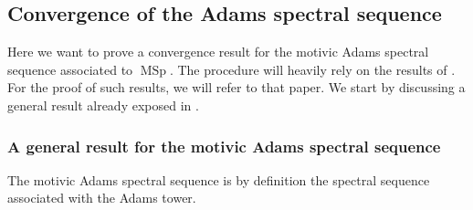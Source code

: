 \documentclass[10pt]{amsart}
\theoremstyle{definition}
\theoremstyle{plain}
\numberwithin{equation}{section}
\newcommand{\0}{\emptyset}
\newcommand{\MSp}{{\operatorname{MSp}}}
\begin{document}
\subsection{Convergence of the Adams spectral sequence}

Here we want to prove a convergence result for the motivic Adams spectral sequence associated to $\MSp$. The procedure will heavily rely on the results of \cite[Section 6]{lev:ellcoh}. For the proof of such results, we will refer to that paper. We start by discussing a general result already exposed in \cite{DugIsa:Adams}.

\subsubsection{A general result for the motivic Adams spectral sequence}
\label{sub:a.s.s}

The motivic Adams spectral sequence is by definition the spectral sequence associated with the Adams tower.
\end{document}
